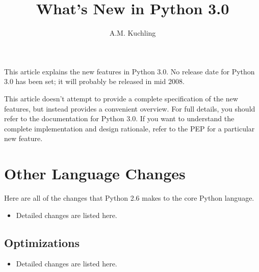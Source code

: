 \documentclass{howto}
\title{What's New in Python 3.0}
\author{A.M. Kuchling}
\begin{document}
\maketitle
\tableofcontents

This article explains the new features in Python 3.0.  No release date
for Python 3.0 has been set; it will probably be released in mid 2008.


This article doesn't attempt to provide a complete specification of
the new features, but instead provides a convenient overview.  For
full details, you should refer to the documentation for Python 3.0.
If you want to understand the complete implementation and design
rationale, refer to the PEP for a particular new feature.





\section{Other Language Changes}

Here are all of the changes that Python 2.6 makes to the core Python
language.

\begin{itemize}

\item Detailed changes are listed here.

\end{itemize}


\subsection{Optimizations}

\begin{itemize}

\item Detailed changes are listed here.

\end{itemize}
\end{document}

